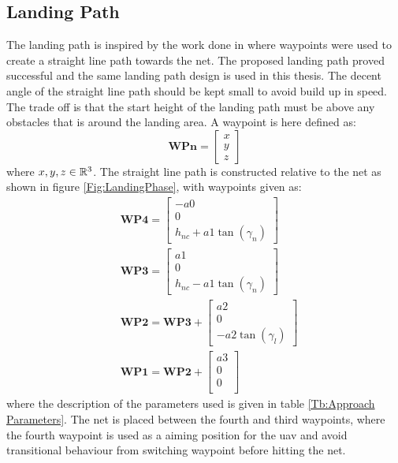\subsection{Landing Path}\label{SS:netApproach}
The landing path is inspired by the work done in \citep{Skulstad&Syversen} where waypoints were used to create a straight line path towards the net. The proposed landing path proved successful and the same landing path design is used in this thesis. The decent angle of the straight line path should be kept small to avoid build up in speed. The trade off is that the start height of the landing path must be above any obstacles that is around the landing area. A waypoint is here defined as:
\begin{equation}
\textbf{WPn} = \begin{bmatrix}
x \\
y \\
z
\end{bmatrix}
\end{equation}
where $x,y,z \in \Bbb R^3$. The straight line path is constructed relative to the net as shown in figure \ref{Fig:LandingPhase}, with waypoints given as:
\begin{subequations}
\begin{align}
&\mathbf{WP4} = 
\begin{bmatrix}
-a0 \\
0 \\
h_{nc} + a1\tan(\gamma_n) 
\end{bmatrix}\\
&\mathbf{WP3} = 
\begin{bmatrix}
a1 \\
0 \\
h_{nc} - a1\tan(\gamma_n)
\end{bmatrix}\\
&\mathbf{WP2} = \mathbf{WP3} + 
\begin{bmatrix}
a2 \\
0 \\
-a2\tan(\gamma_l)
\end{bmatrix}\\
&\mathbf{WP1} = \mathbf{WP2} + 
\begin{bmatrix}
a3 \\
0 \\
0 \\
\end{bmatrix}
\end{align}
\end{subequations}
where the description of the parameters used is given in table \ref{Tb:Approach Parameters}. The net is placed between the fourth and third waypoints, where the fourth waypoint is used as a aiming position for the \gls{uav} and avoid transitional behaviour from switching waypoint before hitting the net.
